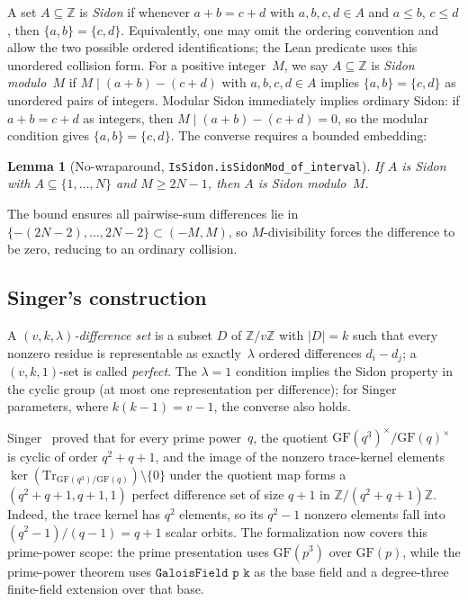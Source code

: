 \documentclass[11pt,a4paper]{article}
\newtheorem{lemma}[theorem]{Lemma}
\begin{document}
A set $A \subseteq \mathbb{Z}$ is \emph{Sidon} if whenever $a + b = c + d$ with
$a, b, c, d \in A$ and $a \le b$, $c \le d$, then $\{a,b\} = \{c,d\}$.
Equivalently, one may omit the ordering convention and allow the two possible
ordered identifications; the Lean predicate uses this unordered collision form.
For a positive integer~$M$, we say $A \subseteq \mathbb{Z}$ is \emph{Sidon modulo~$M$} if
$M \mid (a + b) - (c + d)$ with $a,b,c,d \in A$ implies
$\{a,b\} = \{c,d\}$ as unordered pairs of integers.  Modular Sidon immediately implies
ordinary Sidon: if $a + b = c + d$ as integers, then
$M \mid (a+b)-(c+d) = 0$, so the modular condition gives
$\{a,b\} = \{c,d\}$.  The converse requires a bounded embedding:

\begin{lemma}[No-wraparound, \texttt{IsSidon.isSidonMod\_of\_interval}]
If $A$ is Sidon with $A \subseteq \{1,\dots,N\}$ and $M \ge 2N - 1$, then
$A$ is Sidon modulo~$M$.
\end{lemma}

\noindent The bound ensures all pairwise-sum differences lie in
$\{-(2N-2),\dots,2N-2\} \subset (-M,M)$, so $M$-divisibility forces the
difference to be zero, reducing to an ordinary collision.

\subsection{Singer's construction}

A \emph{$(v,k,\lambda)$-difference set} is a subset $D$ of
$\mathbb{Z}/v\mathbb{Z}$ with $|D| = k$ such that every nonzero residue is
representable as exactly~$\lambda$ ordered differences $d_i - d_j$; a $(v,k,1)$-set
is called \emph{perfect}.  The $\lambda = 1$ condition implies the Sidon
property in the cyclic group (at most one representation per difference);
for Singer parameters, where $k(k-1) = v-1$, the converse also holds.

Singer~\cite{Singer1938} proved that for every prime power~$q$, the quotient
$\mathrm{GF}(q^3)^\times / \mathrm{GF}(q)^\times$ is cyclic of order
$q^2 + q + 1$, and the image of the nonzero trace-kernel elements
$\ker(\mathrm{Tr}_{\mathrm{GF}(q^3)/\mathrm{GF}(q)}) \setminus \{0\}$
under the quotient map forms a $(q^2+q+1, q+1, 1)$
perfect difference set of size $q + 1$ in $\mathbb{Z}/(q^2+q+1)\mathbb{Z}$.
Indeed, the trace kernel has \(q^2\) elements, so its \(q^2-1\) nonzero
elements fall into \((q^2-1)/(q-1)=q+1\) scalar orbits.
The formalization now covers this prime-power scope: the prime presentation uses
\(\mathrm{GF}(p^3)\) over \(\mathrm{GF}(p)\), while the prime-power theorem uses
\(\texttt{GaloisField p k}\) as the base field and a degree-three finite-field
extension over that base.
\end{document}
